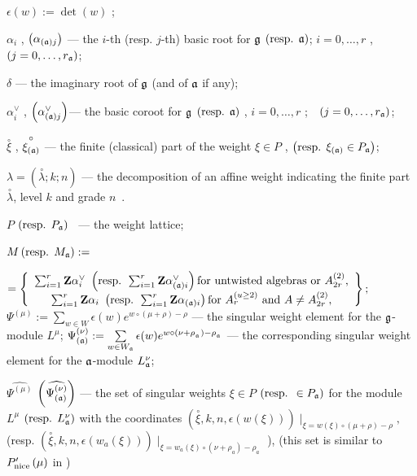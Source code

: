 \documentclass[a4paper,12pt]{article}
\theoremstyle{definition} \newtheorem{Def}{Definition}
\begin{document}
$\epsilon \left( w\right) :=\det \left( w\right) $ ;

$\alpha _{i}$ , $\left( \alpha _{\left( \frak{a}\right) j}\right) $ --- the $i
$-th (resp. $j$-th) basic root for $\frak{g}$ $\left( \text{resp. }\frak{a}%
\right) $; $i=0,\ldots ,r$ ,\ \ $\left( j=0,\ldots ,r_{\frak{a}}\right) $;

$\delta $ --- the imaginary root of $\frak{g}$ (and of $\frak{a}$ if any);

$\alpha _{i}^{\vee }$ , $\left( \alpha _{\left( \frak{a}\right) j}^{\vee
}\right) $--- the basic coroot for $\frak{g}$ $\left( \text{resp. }\frak{a}%
\right) $ , $i=0,\ldots ,r$ ;\ \ $\left( j=0,\ldots ,r_{\frak{a}}\right) $;

$\overset{\circ }{\xi }$ , $\overset{\circ }{\xi _{\left( \frak{a}\right) }}$
--- the finite (classical) part of the weight $\xi \in P$ , $\left( \text{%
resp. }\xi _{\left( \frak{a}\right) }\in P_{\frak{a}}\right) $;

$\lambda =\left( \overset{\circ }{\lambda };k;n\right) $ --- the
decomposition of an affine weight indicating the finite part $\overset{\circ 
}{\lambda }$, level $k$ and grade $n$\ .

$P$ $\left( \text{resp. } P_{\frak{a}}\right) $ \ --- the weight lattice;

$M \left( \text{resp. }M_{\frak{a}}\right) :=$

\noindent $=\left\{ 
\begin{array}{c}
\sum_{i=1}^{r}\mathbf{Z}\alpha _{i}^{\vee }\text{ }\left( \text{resp. }%
\sum_{i=1}^{r}\mathbf{Z}\alpha _{\left( \frak{a}\right) i}^{\vee }\right) 
\text{for untwisted algebras or }A_{2r}^{\left( 2\right) }, \\ 
\sum_{i=1}^{r}\mathbf{Z}\alpha _{i}\text{ }\left( \text{resp. }\sum_{i=1}^{r}%
\mathbf{Z}\alpha _{\left( \frak{a}\right) i}\right) \text{for }A_{r}^{\left(
u\geq 2\right) }\text{ and }A\neq A_{2r}^{\left( 2\right) },
\end{array}
\right\} ;$
$\Psi ^{\left( \mu \right) }:=\sum\limits_{w\in W}\epsilon (w)e^{w\circ (\mu +\rho )-\rho }$ --- the singular weight element for the $\frak{g}$-module $L^{\mu }$;
$\Psi _{\left( \frak{a}\right) }^{\left( \nu \right) }:=\sum\limits_{w\in W_{\frak{a}}}\epsilon (w)e^{w\circ (\nu +\rho
_{_{\frak{a}}})-\rho _{_{\frak{a}}}}$ --- the corresponding singular weight
element for the $\frak{a}$-module $L_{\frak{a}}^{\nu }$;

$\widehat{\Psi ^{\left( \mu \right) }}$ $\left( \widehat{\Psi _{\left( \frak{%
a}\right) }^{\left( \nu \right) }}\right) $ --- the set of singular weights $%
\xi \in P$ $\left( \text{resp. }\in P_{\frak{a}}\right) $ for the module $%
L^{\mu }$ $\left( \text{resp. }L_{\frak{a}}^{\nu }\right) $ with the
coordinates $\left( \overset{\circ }{\xi },k,n,\epsilon \left( w\left( \xi
\right) \right) \right) \mid _{\xi =w\left( \xi \right) \circ (\mu +\rho
)-\rho },$ (resp. $\left( \overset{\circ }{\xi },k,n,\epsilon \left(
w_{a}\left( \xi \right) \right) \right) \mid _{\xi =w_{a}\left( \xi \right)
\circ (\nu +\rho _{a})-\rho _{a}}$ ), (this set is similar to $P_{\mathrm{%
nice}}^{\prime }\left( \mu \right) $ in \cite{wakimoto2001idl})
\end{document}
